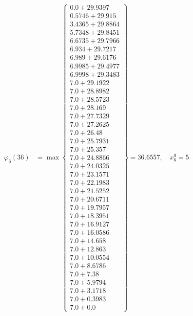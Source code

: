 \documentclass{article}
\begin{document}
\begin{align*}
\varphi_{6}(36) &= \max \left\{ \begin{array}{c}
0.0 + 29.9397 \\
 0.5746 + 29.915 \\
 3.4365 + 29.8864 \\
 5.7348 + 29.8451 \\
 6.6735 + 29.7966 \\
 6.934 + 29.7217 \\
 6.989 + 29.6176 \\
 6.9985 + 29.4977 \\
 6.9998 + 29.3483 \\
 7.0 + 29.1922 \\
 7.0 + 28.8982 \\
 7.0 + 28.5723 \\
 7.0 + 28.169 \\
 7.0 + 27.7329 \\
 7.0 + 27.2625 \\
 7.0 + 26.48 \\
 7.0 + 25.7931 \\
 7.0 + 25.357 \\
 7.0 + 24.8866 \\
 7.0 + 24.0325 \\
 7.0 + 23.1571 \\
 7.0 + 22.1983 \\
 7.0 + 21.5252 \\
 7.0 + 20.6711 \\
 7.0 + 19.7957 \\
 7.0 + 18.3951 \\
 7.0 + 16.9127 \\
 7.0 + 16.0586 \\
 7.0 + 14.658 \\
 7.0 + 12.863 \\
 7.0 + 10.0554 \\
 7.0 + 8.6786 \\
 7.0 + 7.38 \\
 7.0 + 5.9794 \\
 7.0 + 3.1718 \\
 7.0 + 0.3983 \\
 7.0 + 0.0
\end{array} \right\}=36.6557, \quad x_{6}^0=5\\
  
 \\ 
\end{align*}
\end{document}
